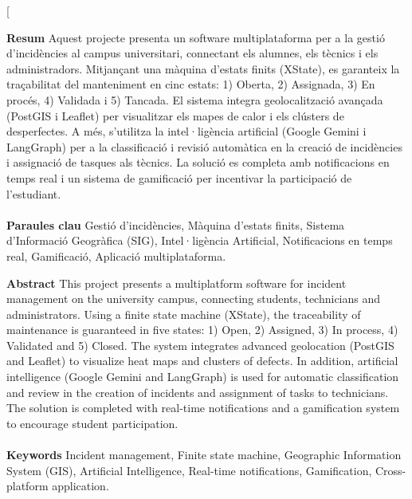 \documentclass[10pt,a4paper,twocolumn,twoside]{article}
\begin{document}
	\twocolumn[\begin{@twocolumnfalse}
		
		
		\maketitle
		
		\thispagestyle{primerapagina}
			\begin{center}
				\parbox{0.915\textwidth}
				{\sffamily
					\textbf{Resum}
					Aquest projecte presenta un software multiplataforma per a la gestió d'incidències al campus universitari, connectant els alumnes, els tècnics i els administradors. Mitjançant una màquina d'estats finits (XState), es garanteix la traçabilitat del manteniment en cinc estats: 1) Oberta, 2) Assignada, 3) En procés, 4) Validada i 5) Tancada. El sistema integra geolocalització avançada (PostGIS i Leaflet) per visualitzar els mapes de calor i els clústers de desperfectes. A més, s'utilitza la intel·ligència artificial (Google Gemini i LangGraph) per a la classificació i revisió automàtica en la creació de incidències i assignació de tasques als tècnics. La solució es completa amb notificacions en temps real i un sistema de gamificació per incentivar la participació de l'estudiant.
					\\
					\\
					\textbf{Paraules clau} Gestió d'incidències, Màquina d'estats finits, Sistema d'Informació Geogràfica (SIG), Intel·ligència Artificial, Notificacions en temps real, Gamificació, Aplicació multiplataforma.
					
					\bigskip
					
					\textbf{Abstract}
					This project presents a multiplatform software for incident management on the university campus, connecting students, technicians and administrators. Using a finite state machine (XState), the traceability of maintenance is guaranteed in five states: 1) Open, 2) Assigned, 3) In process, 4) Validated and 5) Closed. The system integrates advanced geolocation (PostGIS and Leaflet) to visualize heat maps and clusters of defects. In addition, artificial intelligence (Google Gemini and LangGraph) is used for automatic classification and review in the creation of incidents and assignment of tasks to technicians. The solution is completed with real-time notifications and a gamification system to encourage student participation.
					\\
					\\
					\textbf{Keywords} Incident management, Finite state machine, Geographic Information System (GIS), Artificial Intelligence, Real-time notifications, Gamification, Cross-platform application.
				}
				

\end{center}
\end{@twocolumnfalse}
\end{document}
